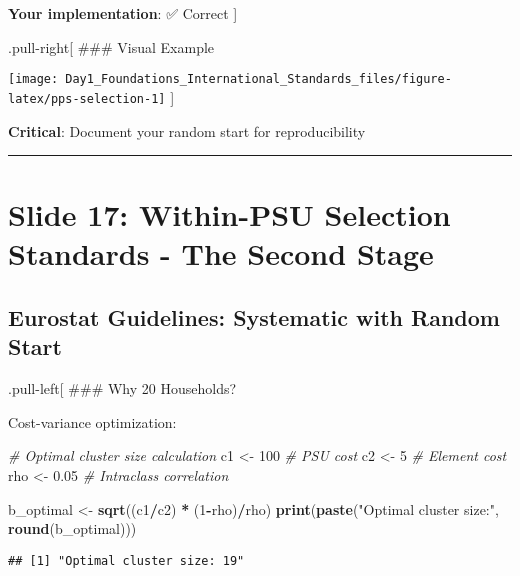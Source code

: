 \documentclass[
]{article}
\newenvironment{Shaded}{\begin{snugshade}}{\end{snugshade}}
\newcommand{\CommentTok}[1]{\textcolor[rgb]{0.56,0.35,0.01}{\textit{#1}}}
\newcommand{\DecValTok}[1]{\textcolor[rgb]{0.00,0.00,0.81}{#1}}
\newcommand{\FloatTok}[1]{\textcolor[rgb]{0.00,0.00,0.81}{#1}}
\newcommand{\FunctionTok}[1]{\textcolor[rgb]{0.13,0.29,0.53}{\textbf{#1}}}
\newcommand{\NormalTok}[1]{#1}
\newcommand{\OtherTok}[1]{\textcolor[rgb]{0.56,0.35,0.01}{#1}}
\newcommand{\SpecialCharTok}[1]{\textcolor[rgb]{0.81,0.36,0.00}{\textbf{#1}}}
\newcommand{\StringTok}[1]{\textcolor[rgb]{0.31,0.60,0.02}{#1}}
\begin{document}
\textbf{Your implementation}: ✅ Correct {]}

.pull-right{[} \#\#\# Visual Example

\texttt{[image: Day1\_Foundations\_International\_Standards\_files/figure-latex/pps-selection-1]}
{]}

\textbf{Critical}: Document your random start for reproducibility

\begin{center}\rule{0.5\linewidth}{0.5pt}\end{center}

\section{Slide 17: Within-PSU Selection Standards - The Second
Stage}\label{slide-17-within-psu-selection-standards---the-second-stage}

\subsection{Eurostat Guidelines: Systematic with Random
Start}\label{eurostat-guidelines-systematic-with-random-start}

.pull-left{[} \#\#\# Why 20 Households?

Cost-variance optimization:

\begin{Shaded}
\begin{Highlighting}[]
\CommentTok{\# Optimal cluster size calculation}
\NormalTok{c1 }\OtherTok{\textless{}{-}} \DecValTok{100}  \CommentTok{\# PSU cost}
\NormalTok{c2 }\OtherTok{\textless{}{-}} \DecValTok{5}    \CommentTok{\# Element cost  }
\NormalTok{rho }\OtherTok{\textless{}{-}} \FloatTok{0.05}  \CommentTok{\# Intraclass correlation}

\NormalTok{b\_optimal }\OtherTok{\textless{}{-}} \FunctionTok{sqrt}\NormalTok{((c1}\SpecialCharTok{/}\NormalTok{c2) }\SpecialCharTok{*}\NormalTok{ (}\DecValTok{1}\SpecialCharTok{{-}}\NormalTok{rho)}\SpecialCharTok{/}\NormalTok{rho)}
\FunctionTok{print}\NormalTok{(}\FunctionTok{paste}\NormalTok{(}\StringTok{"Optimal cluster size:"}\NormalTok{, }
            \FunctionTok{round}\NormalTok{(b\_optimal)))}
\end{Highlighting}
\end{Shaded}

\begin{verbatim}
## [1] "Optimal cluster size: 19"
\end{verbatim}
\end{document}

